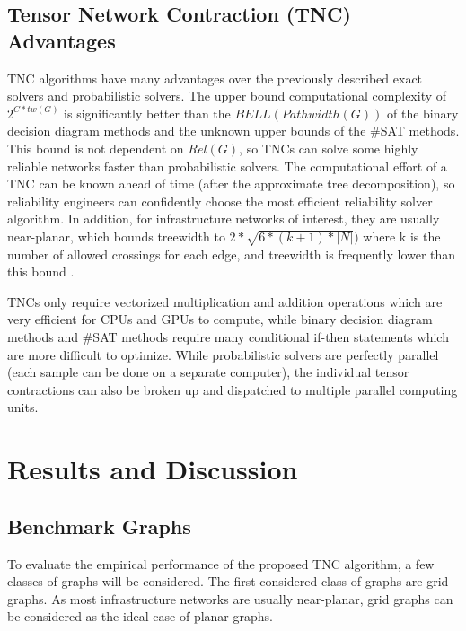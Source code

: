 \documentclass[12pt,twocolumn]{article}
\begin{document}
\hypertarget{tensor-network-contraction-tnc-advantages}{%
\subsection{Tensor Network Contraction (TNC) Advantages}\label{tensor-network-contraction-tnc-advantages}}

TNC algorithms have many advantages over the previously described exact solvers and probabilistic solvers. The upper bound computational complexity of \(2^{C*tw(G)}\) is significantly better than the \(BELL(Pathwidth(G))\) of the binary decision diagram methods and the unknown upper bounds of the \#SAT methods. This bound is not dependent on \(Rel(G)\), so TNCs can solve some highly reliable networks faster than probabilistic solvers. The computational effort of a TNC can be known ahead of time (after the approximate tree decomposition), so reliability engineers can confidently choose the most efficient reliability solver algorithm. In addition, for infrastructure networks of interest, they are usually near-planar, which bounds treewidth to \(2*\sqrt{6*(k+1)*|N|})\) \cite{dujmovic2017structure} where k is the number of allowed crossings for each edge, and treewidth is frequently lower than this bound \cite{maniu2019experimental}.

TNCs only require vectorized multiplication and addition operations which are very efficient for CPUs and GPUs to compute, while binary decision diagram methods and \#SAT methods require many conditional if-then statements which are more difficult to optimize. While probabilistic solvers are perfectly parallel (each sample can be done on a separate computer), the individual tensor contractions can also be broken up and dispatched to multiple parallel computing units.

\hypertarget{results-and-discussion}{%
\section{Results and Discussion}\label{results-and-discussion}}

\hypertarget{benchmark-graphs}{%
\subsection{Benchmark Graphs}\label{benchmark-graphs}}

To evaluate the empirical performance of the proposed TNC algorithm, a few classes of graphs will be considered. The first considered class of graphs are grid graphs. As most infrastructure networks are usually near-planar, grid graphs can be considered as the ideal case of planar graphs.
\end{document}
